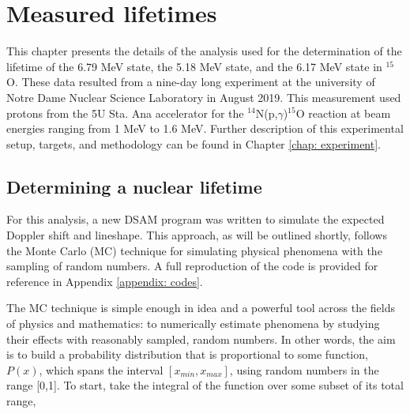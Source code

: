 %
%
%
%
%
%
%
%
%
%


%
%


\chapter{Measured lifetimes}
\label{chap: lifetime}

This chapter presents the details of the analysis used for the determination of the lifetime of the 6.79 MeV state, the 5.18 MeV state, and the 6.17 MeV state in $^{15}$O. These data resulted from a nine-day long experiment at the university of Notre Dame Nuclear Science Laboratory in August 2019. This measurement used protons from the 5U Sta. Ana accelerator for the $^{14}$N(p,$\gamma$)$^{15}$O reaction at beam energies ranging from 1 MeV to 1.6 MeV. Further description of this experimental setup, targets, and methodology can be found in Chapter \ref{chap: experiment}.	

\section{Determining a nuclear lifetime}
\label{sec: lifetime determination}

For this analysis, a new DSAM program was written to simulate the expected Doppler shift and lineshape. This approach, as will be outlined shortly, follows the Monte Carlo (MC) technique for simulating physical phenomena with the sampling of random numbers. A full reproduction of the code is provided for reference in Appendix \ref{appendix: codes}. 

The MC technique is simple enough in idea and a powerful tool across the fields of physics and mathematics: to numerically estimate phenomena by studying their effects with reasonably sampled, random numbers. In other words, the aim is to build a probability distribution that is proportional to some function, $P(x)$, which spans the interval $[x_{min}, x_{max}]$, using random numbers in the range [0,1]. To start, take the integral of the function over some subset of its total range,

